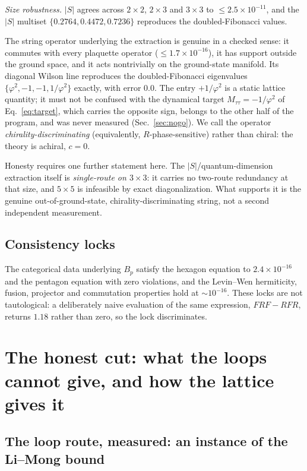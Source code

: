 \documentclass[aps,pra,twocolumn,superscriptaddress,longbibliography,floatfix,nofootinbib]{revtex4-2}
\begin{document}
\emph{Size robustness.} $|S|$ agrees across $2\times2$, $2\times3$ and
$3\times3$ to $\le2.5\times10^{-11}$, and the $|S|$ multiset
$\{0.2764,0.4472,0.7236\}$ reproduces the doubled-Fibonacci values.

The string operator underlying the extraction is genuine in a checked sense:
it commutes with every plaquette operator ($\le1.7\times10^{-16}$), it has
support outside the ground space, and it acts nontrivially on the ground-state
manifold. Its diagonal Wilson line reproduces the doubled-Fibonacci eigenvalues
$\{\varphi^{2},-1,-1,1/\varphi^{2}\}$ exactly, with error $0.0$. The entry
$+1/\varphi^{2}$ is a static lattice quantity; it must not be confused with the
dynamical target $M_{\tau\tau}=-1/\varphi^{2}$ of Eq.~\eqref{eq:target}, which
carries the opposite sign, belongs to the other half of the program, and was
never measured (Sec.~\ref{sec:nogo}). We call the operator
\emph{chirality-discriminating} (equivalently, $R$-phase-sensitive) rather than
chiral: the theory is achiral, $c=0$.

Honesty requires one further statement here. The $|S|$/quantum-dimension
extraction itself is \emph{single-route on $3\times3$}: it carries no
two-route redundancy at that size, and $5\times5$ is infeasible by exact
diagonalization. What supports it is the genuine out-of-ground-state,
chirality-discriminating string, not a second independent measurement.

\subsection{Consistency locks}
\label{sec:locks}

The categorical data underlying $B_p$ satisfy the hexagon equation to
$2.4\times10^{-16}$ and the pentagon equation with zero violations, and the
Levin--Wen hermiticity, fusion, projector and commutation properties hold at
${\sim}10^{-16}$. These locks are not tautological: a deliberately naive
evaluation of the same expression, $FRF-RFR$, returns $1.18$ rather than zero,
so the lock discriminates.

\section{The honest cut: what the loops cannot give, and how the lattice
gives it}
\label{sec:cut}

\subsection{The loop route, measured: an instance of the Li--Mong bound}
\label{sec:wedderburn}
\end{document}
